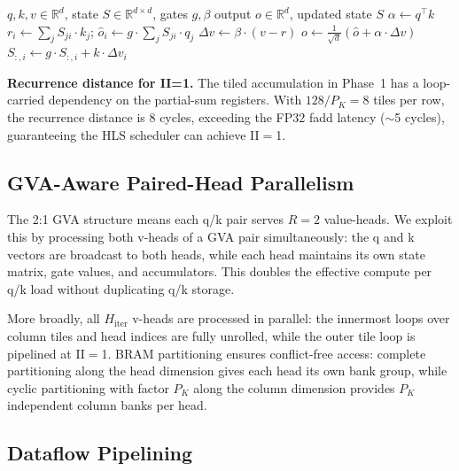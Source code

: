 \documentclass[conference]{IEEEtran}
\begin{document}
\begin{algorithm}[t]
\caption{Fused GDN Decode Step (Single Head)}
\label{alg:fused}
\begin{algorithmic}[1]
\REQUIRE $q, k, v \in \mathbb{R}^d$, state $S \in \mathbb{R}^{d \times d}$, gates $g, \beta$
\ENSURE output $o \in \mathbb{R}^d$, updated state $S$
\STATE $\alpha \leftarrow q^{\!\top}\! k$ \hfill{}
  \STATE $r_i \leftarrow \sum_j S_{ji} \cdot k_j$; \quad
         $\hat{o}_i \leftarrow g \cdot \sum_j S_{ji} \cdot q_j$
\ENDFOR
\STATE $\Delta v \leftarrow \beta \cdot (v - r)$ \hfill{}
\STATE $o \leftarrow \tfrac{1}{\sqrt{d}}(\hat{o} + \alpha \cdot \Delta v)$ \hfill{}
  \STATE $S_{:,i} \leftarrow g \cdot S_{:,i} + k \cdot \Delta v_i$
\ENDFOR
\end{algorithmic}
\end{algorithm}

\noindent\textbf{Recurrence distance for II=1.} The tiled accumulation in Phase~1
has a loop-carried dependency on the partial-sum registers. With
$128/P_K = 8$ tiles per row, the recurrence distance is 8 cycles, exceeding
the FP32 fadd latency ($\sim$5 cycles), guaranteeing the HLS scheduler can
achieve II$=$1.

\subsection{GVA-Aware Paired-Head Parallelism}
\label{sec:gva}

The 2:1 GVA structure means each q/k pair serves $R{=}2$ value-heads.
We exploit this by processing both v-heads of a GVA pair simultaneously:
the q and k vectors are broadcast to both heads, while each head
maintains its own state matrix, gate values, and accumulators. This
doubles the effective compute per q/k load without duplicating q/k
storage.

More broadly, all $H_{\mathrm{iter}}$ v-heads are processed in parallel:
the innermost loops over column tiles and head indices are fully unrolled,
while the outer tile loop is pipelined at II$=$1. BRAM partitioning
ensures conflict-free access: complete partitioning along the head
dimension gives each head its own bank group, while cyclic partitioning
with factor $P_K$ along the column dimension provides $P_K$ independent
column banks per head.

\subsection{Dataflow Pipelining}
\label{sec:dataflow}
\end{document}
